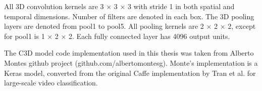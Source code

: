 

All 3D convolution kernels are 3 × 3 × 3 with stride 1 in both spatial and temporal dimensions. Number of filters are denoted in each box. The 3D pooling layers are denoted from pool1 to pool5. All pooling kernels are 2 × 2 × 2, except for pool1 is 1 × 2 × 2. Each fully connected layer has 4096 output units.

The C3D model code implementation used in this thesis was taken from Alberto Montes github project (github.com/albertomontesg). Monte's implementation is a Keras \cite{Chollet2015Keras} model, converted from the original Caffe \cite{JiaCaffe:} implementation by Tran et al. \cite{Tran2015LearningNetworks} for large-scale video classification. \cite{Karpathy2014Large-scaleNetworks}